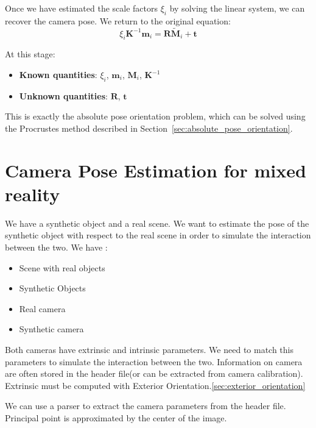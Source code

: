 \documentclass[11pt,a4paper]{article}
\theoremstyle{definition}
\theoremstyle{plain}
\theoremstyle{remark}
\begin{document}
Once we have estimated the scale factors $\xi_i$ by solving the linear system, we can recover the camera pose. We return to the original equation:
\begin{equation} \nonumber
\xi_i \mathbf{K}^{-1} \mathbf{m}_i = \mathbf{R} \tilde{\mathbf{M}}_i + \mathbf{t}
\end{equation}

\begin{tcolorbox}[colback=teal!5!white,colframe=teal!75!black,title=\textbf{Final Step}]
At this stage:
\begin{itemize}
    \item \textbf{Known quantities}: $\xi_i$, $\mathbf{m}_i$, $\mathbf{M}_i$, $\mathbf{K}^{-1}$
    \item \textbf{Unknown quantities}: $\mathbf{R}$, $\mathbf{t}$
\end{itemize}
This is exactly the absolute pose orientation problem, which can be solved using the Procrustes method described in Section~\ref{sec:absolute_pose_orientation}.
\end{tcolorbox}   


\section{Camera Pose Estimation for mixed reality}\label{sec:camera_pose_estimation_mixed_reality}
We have a synthetic object and a real scene.  
We want to estimate the pose of the synthetic object with respect to the real scene in order
to simulate the interaction between the two.
We have :
\begin{itemize}
    \item Scene with real objects
    \item Synthetic Objects
    \item Real camera
    \item Synthetic camera
\end{itemize}
Both cameras have extrinsic and intrinsic parameters.
We need to match this parameters to simulate the interaction between the two.
Information on camera are often stored in the header file(or can be extracted
from camera calibration).
Extrinsic must be computed with Exterior Orientation.\ref{sec:exterior_orientation}

We can use a parser to extract the camera parameters from the header file.
Principal point is approximated by the center of the image.
\end{document}

